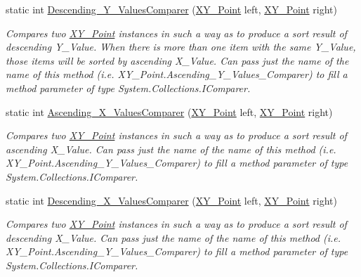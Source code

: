\begin{DoxyCompactItemize}
static int \mbox{\hyperlink{struct_c_s_i_1_1_library_1_1_data_types_1_1_x_y___point_af8c1207e1a624367f6cf1c7ad0b28786}{Descending\+\_\+\+Y\+\_\+\+Values\+Comparer}} (\mbox{\hyperlink{struct_c_s_i_1_1_library_1_1_data_types_1_1_x_y___point}{X\+Y\+\_\+\+Point}} left, \mbox{\hyperlink{struct_c_s_i_1_1_library_1_1_data_types_1_1_x_y___point}{X\+Y\+\_\+\+Point}} right)
\begin{DoxyCompactList}\small\item\em Compares two \mbox{\hyperlink{struct_c_s_i_1_1_library_1_1_data_types_1_1_x_y___point}{X\+Y\+\_\+\+Point}} instances in such a way as to produce a sort result of descending Y\+\_\+\+Value. When there is more than one item with the same Y\+\_\+\+Value, those items will be sorted by ascending X\+\_\+\+Value. Can pass just the name of the name of this method (i.\+e. X\+Y\+\_\+\+Point.\+Ascending\+\_\+\+Y\+\_\+\+Values\+\_\+\+Comparer) to fill a method parameter of type System.\+Collections.\+I\+Comparer. \end{DoxyCompactList}\item 
static int \mbox{\hyperlink{struct_c_s_i_1_1_library_1_1_data_types_1_1_x_y___point_a862f6f8db7dff3de77166a4061bb8724}{Ascending\+\_\+\+X\+\_\+\+Values\+Comparer}} (\mbox{\hyperlink{struct_c_s_i_1_1_library_1_1_data_types_1_1_x_y___point}{X\+Y\+\_\+\+Point}} left, \mbox{\hyperlink{struct_c_s_i_1_1_library_1_1_data_types_1_1_x_y___point}{X\+Y\+\_\+\+Point}} right)
\begin{DoxyCompactList}\small\item\em Compares two \mbox{\hyperlink{struct_c_s_i_1_1_library_1_1_data_types_1_1_x_y___point}{X\+Y\+\_\+\+Point}} instances in such a way as to produce a sort result of ascending X\+\_\+\+Value. Can pass just the name of the name of this method (i.\+e. X\+Y\+\_\+\+Point.\+Ascending\+\_\+\+Y\+\_\+\+Values\+\_\+\+Comparer) to fill a method parameter of type System.\+Collections.\+I\+Comparer. \end{DoxyCompactList}\item 
static int \mbox{\hyperlink{struct_c_s_i_1_1_library_1_1_data_types_1_1_x_y___point_ac51d0348e69f3cbe10d2fec50ab3d271}{Descending\+\_\+\+X\+\_\+\+Values\+Comparer}} (\mbox{\hyperlink{struct_c_s_i_1_1_library_1_1_data_types_1_1_x_y___point}{X\+Y\+\_\+\+Point}} left, \mbox{\hyperlink{struct_c_s_i_1_1_library_1_1_data_types_1_1_x_y___point}{X\+Y\+\_\+\+Point}} right)
\begin{DoxyCompactList}\small\item\em Compares two \mbox{\hyperlink{struct_c_s_i_1_1_library_1_1_data_types_1_1_x_y___point}{X\+Y\+\_\+\+Point}} instances in such a way as to produce a sort result of descending X\+\_\+\+Value. Can pass just the name of the name of this method (i.\+e. X\+Y\+\_\+\+Point.\+Ascending\+\_\+\+Y\+\_\+\+Values\+\_\+\+Comparer) to fill a method parameter of type System.\+Collections.\+I\+Comparer. \end{DoxyCompactList}\item 

\end{DoxyCompactItemize}

